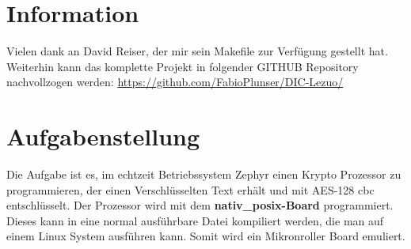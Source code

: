 \newpage
\section{Information}
    Vielen dank an David Reiser, der mir sein Makefile zur Verfügung gestellt hat. 
    \\
    Weiterhin kann das komplette Projekt in folgender GITHUB Repository nachvollzogen werden: 
    \href{https://github.com/FabioPlunser/DIC-Lezuo/tree/master/2.Semester-serial_crypto/DIC-serial-crypto-Programm}{https://github.com/FabioPlunser/DIC-Lezuo/}

\section{Aufgabenstellung}
    Die Aufgabe ist es, im echtzeit Betriebssystem Zephyr einen Krypto Prozessor zu programmieren, der einen Verschlüsselten Text erhält und 
    mit AES-128 cbc entschlüsselt.
    Der Prozessor wird mit dem \textbf{nativ\_posix-Board} programmiert. Dieses kann in eine normal ausführbare Datei 
    kompiliert werden, die man auf einem Linux System ausführen kann. Somit wird ein Mikronroller Board emuliert.  
    

